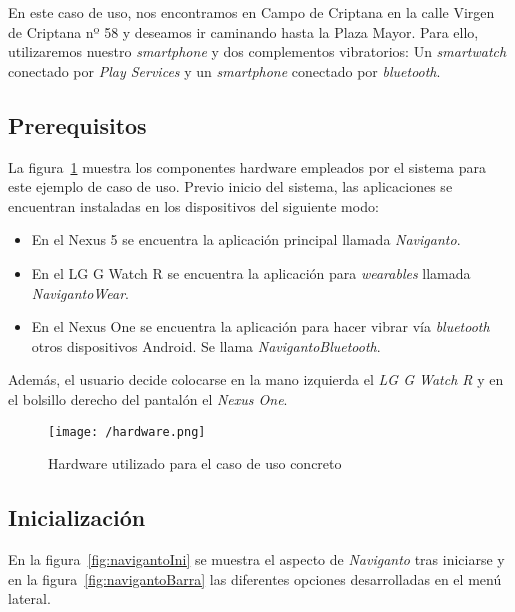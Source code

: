 En este caso de uso, nos encontramos en Campo de Criptana en la calle Virgen de Criptana nº 58 y
deseamos ir caminando hasta la Plaza Mayor. Para ello, utilizaremos nuestro \emph{smartphone} y dos
complementos vibratorios: Un \emph{smartwatch} conectado por \emph{Play Services} y un
\emph{smartphone} conectado por \emph{bluetooth}.

\subsection{Prerequisitos}

La figura~\ref{fig:hardware} muestra los componentes hardware empleados por el sistema para este
ejemplo de caso de uso. Previo inicio del sistema, las aplicaciones se encuentran instaladas en los
dispositivos del siguiente modo:

\begin{itemize}
  \item En el Nexus 5 se encuentra la aplicación principal llamada \emph{Naviganto}.
  \item En el LG G Watch R se encuentra la aplicación para \emph{wearables} llamada
    \emph{NavigantoWear}.
  \item En el Nexus One se encuentra la aplicación para hacer vibrar vía \emph{bluetooth} otros
    dispositivos Android. Se llama \emph{NavigantoBluetooth}.
\end{itemize}

Además, el usuario decide colocarse en la mano izquierda el \emph{LG G Watch R} y en el bolsillo
derecho del pantalón el \emph{Nexus One}.

\begin{figure}[!h]
  \begin{center}
    \texttt{[image: /hardware.png]}
    \caption{Hardware utilizado para el caso de uso concreto}
    \label{fig:hardware}
  \end{center}
\end{figure}

\subsection{Inicialización}

En la figura~\ref{fig:navigantoIni} se muestra el aspecto de \emph{Naviganto} tras iniciarse y en la
figura~\ref{fig:navigantoBarra} las diferentes opciones desarrolladas en el menú lateral.

